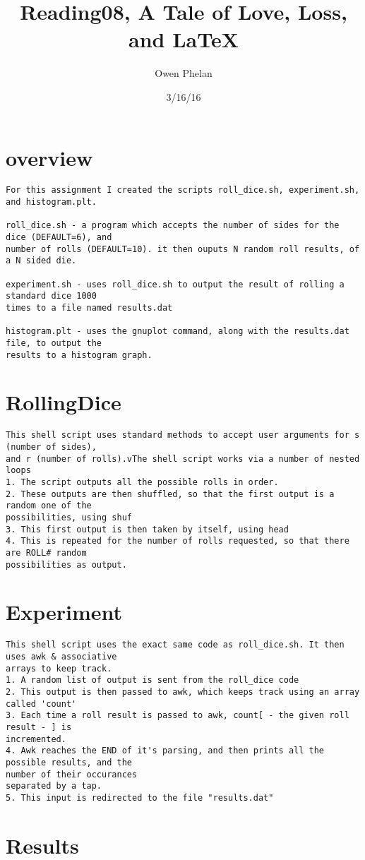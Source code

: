\documentclass{article}
\title{Reading08, A Tale of Love, Loss, and LaTeX}
\date{3/16/16}
\author{Owen Phelan}
\begin{document}
	\maketitle
	\section{overview}
	\begin{verbatim}
For this assignment I created the scripts roll_dice.sh, experiment.sh, and histogram.plt.

roll_dice.sh - a program which accepts the number of sides for the dice (DEFAULT=6), and 
number of rolls (DEFAULT=10). it then ouputs N random roll results, of a N sided die.

experiment.sh - uses roll_dice.sh to output the result of rolling a standard dice 1000 
times to a file named results.dat

histogram.plt - uses the gnuplot command, along with the results.dat file, to output the 
results to a histogram graph.
	\end{verbatim}
	\section{RollingDice}
	\begin{verbatim}
This shell script uses standard methods to accept user arguments for s (number of sides), 
and r (number of rolls).vThe shell script works via a number of nested loops
1. The script outputs all the possible rolls in order. 
2. These outputs are then shuffled, so that the first output is a random one of the 
possibilities, using shuf
3. This first output is then taken by itself, using head
4. This is repeated for the number of rolls requested, so that there are ROLL# random 
possibilities as output.
	\end{verbatim}
	\section{Experiment}
	\begin{verbatim}
This shell script uses the exact same code as roll_dice.sh. It then uses awk & associative 
arrays to keep track.
1. A random list of output is sent from the roll_dice code
2. This output is then passed to awk, which keeps track using an array called 'count'
3. Each time a roll result is passed to awk, count[ - the given roll result - ] is 
incremented.
4. Awk reaches the END of it's parsing, and then prints all the possible results, and the 
number of their occurances
separated by a tap.
5. This input is redirected to the file "results.dat"
	\end{verbatim}
	\section{Results}
	\begin{figure}[h!]
	\centering
	\end{figure}
	\newpage
\end{document}
